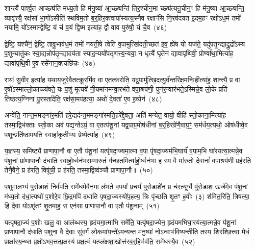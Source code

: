 शान्त्यै॑ पार्श्व॒त आच्छ्य॑ति मध्य॒तो हि म॑नु॒ष्या॑ आ॒च्छ्यन्ति॑ तिर॒श्चीन॒मा च्छ्य॑त्यनू॒चीन॒ꣳ॒ हि म॑नु॒ष्या॑ आ॒च्छ्यन्ति॒ व्यावृ॑त्त्यै॒ रक्ष॑सां भा॒गो॑\-ऽसीति॑ स्थविम॒तो ब॒र्॒\mbox{}हिर॒क्त्वापा᳚स्यत्य॒स्नैव रक्षाꣳ॑सि नि॒रव॑दयत इ॒दम॒हꣳ रक्षो॑\-ऽध॒मं तमो॑ नयामि॒ यो᳚\-ऽस्मान्द्वेष्टि॒ यं च॑ व॒यं द्वि॒ष्म इत्या॑ह॒ द्वौ वाव पुरु॑षौ॒ यं चै॒व~(४६)

द्वे॒ष्टि॒ यश्चै॑नं॒ द्वेष्टि॒ तावु॒भाव॑ध॒मं तमो॑ नयती॒षे त्वेति॑ व॒पामुत्खि॑दती॒च्छत॑ इव॒ ह्ये॑ष यो यज॑ते॒ यदु॑पतृ॒न्द्याद्रु॒द्रो᳚\-ऽस्य प॒शून्घातु॑कः स्या॒द्यन्नोप॑तृ॒न्द्यादय॑ता स्याद॒न्ययो॑पतृ॒णत्त्य॒न्यया॒ न धृत्यै॑ घृ॒तेन॑ द्यावा\-पृथिवी॒ प्रोर्ण्वा॑था॒मित्या॑ह॒ द्यावा॑\-पृथि॒वी ए॒व रसे॑नान॒क्त्यछि॑न्नः~(४७)

रायः॑ सु॒वीर॒ इत्या॑ह यथाय॒जुरे॒वैतत्क्रू॒रमि॑व॒ वा ए॒तत्क॑रोति॒ यद्व॒पामु॑त्खि॒दत्यु॒र्व॑न्तरि॑क्ष॒मन्वि॒हीत्या॑ह॒ शान्त्यै॒ प्र वा ए॒षो᳚\-ऽस्माल्लो॒काच्च्य॑वते॒ यः प॒शुं मृ॒त्यवे॑ नी॒यमा॑नमन्वा॒रभ॑ते वपा॒श्रप॑णी॒ पुन॑र॒न्वार॑भते॒\-ऽस्मिन्ने॒व लो॒के प्रति॑ तिष्ठत्य॒ग्निना॑ पु॒रस्ता॑देति॒ रक्ष॑सा॒मप॑हत्या॒ अथो॑ दे॒वता॑ ए॒व ह॒व्येन॑~(४८)

अन्वे॑ति॒ नान्त॒ममङ्गा॑र॒मति॑ हरे॒द्यद॑न्त॒ममङ्गा॑रमति॒हरे᳚द्दे॒वता॒ अति॑ मन्येत॒ वायो॒ वीहि॑ स्तो॒काना॒मित्या॑ह॒ तस्मा॒द्विभ॑क्ताः स्तो॒का अव॑ पद्य॒न्ते\-ऽग्रं॒ वा ए॒तत्प॑शू॒नां यद्व॒पाग्र॒मोष॑धीनां ब॒र्॒\mbox{}हिरग्रे॑णै॒वाग्र॒ꣳ॒ सम॑र्धय॒त्यथो॒ ओष॑धीष्वे॒व प॒शून्प्रति॑\-ष्ठापयति॒ स्वाहा॑कृतीभ्यः॒ प्रेष्येत्या॑ह~(४९)

य॒ज्ञस्य॒ समि॑ष्ट्यै प्राणापा॒नौ वा ए॒तौ प॑शू॒नां यत्पृ॑षदा॒ज्यमा॒त्मा व॒पा पृ॑षदा॒ज्यम॑भि॒घार्य॑ व॒पाम॒भि घा॑रयत्या॒त्मन्ने॒व प॑शू॒नां प्रा॑णापा॒नौ द॑धाति॒ स्वाहो॒र्ध्वन॑भसम्मारु॒तं ग॑च्छत॒मित्या॑हो॒र्ध्वन॑भा ह स्म॒ वै मा॑रु॒तो दे॒वानां᳚ वपा॒श्रप॑णी॒ प्रह॑रति॒ तेनै॒वैने॒ प्र ह॑रति॒ विषू॑ची॒ प्र ह॑रति॒ तस्मा॒द्विष्व॑ञ्चौ प्राणापा॒नौ॥~(५०)

{\anuvakamend[{स्वधि॑तिश्चै॒वाच्छि॑न्नो ह॒व्येने॒ष्येत्या॑ह॒ षट्च॑त्वारिꣳशच्च}]}%

प॒शुमा॒लभ्य॑ पुरो॒डाशं॒ निर्व॑पति॒ समे॑धमे॒वैन॒मा ल॑भते व॒पया᳚ प्र॒चर्य॑ पुरो॒डाशे॑न॒ प्र च॑र॒त्यूर्ग्वै पु॑रो॒डाश॒ ऊर्ज॑मे॒व प॑शू॒नां म॑ध्य॒तो द॑धा॒त्यथो॑ प॒शोरे॒व छि॒द्रमपि॑ दधाति पृषदा॒ज्यस्यो॑प॒हत्य॒ त्रिः पृ॑च्छति शृ॒तꣳ ह॒वीः~(३) श॑मित॒रिति॒ त्रिष॑त्या॒ हि दे॒वा यो\-ऽशृ॑तꣳ शृ॒तमाह॒ स एन॑सा प्राणापा॒नौ वा ए॒तौ प॑शू॒नाम्~(५१)

यत्पृ॑षदा॒ज्यं प॒शोः खलु॒ वा आल॑ब्धस्य॒ हृद॑यमा॒त्माभि समे॑ति॒ यत्पृ॑षदा॒ज्येन॒ हृद॑यमभिघा॒रय॑त्या॒त्मन्ने॒व प॑शू॒नां प्रा॑णापा॒नौ द॑धाति प॒शुना॒ वै दे॒वाः सु॑व॒र्गं लो॒कमा॑य॒न्ते॑\-ऽमन्यन्त मनु॒ष्या॑ नो॒\-ऽन्वाभ॑विष्य॒न्तीति॒ तस्य॒ शिर॑श्छि॒त्त्वा मेधं॒ प्राक्षा॑रय॒न्थ्स प्र॒क्षो॑\-ऽभव॒त्तत्प्र॒क्षस्य॑ प्रक्ष॒त्वं यत्प्ल॑क्षशा॒खोत्त॑रब॒र्॒\mbox{}हिर्भव॑ति॒ समे॑धस्यै॒व~(५२)

